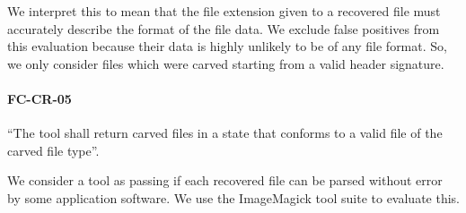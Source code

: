  We interpret this to mean that the file extension given to a recovered file must accurately describe the format of the file data. We exclude false positives from this evaluation because their data is highly unlikely to be of any file format. So, we only consider files which were carved starting from a valid header signature.
 
 \paragraph{FC-CR-05} ``The tool shall return carved files in a state that conforms to a valid file of the carved file type''.~\cite{carving_standards}
 
 We consider a tool as passing if each recovered file can be parsed without error by some application software.
 We use the ImageMagick tool suite to evaluate this.
